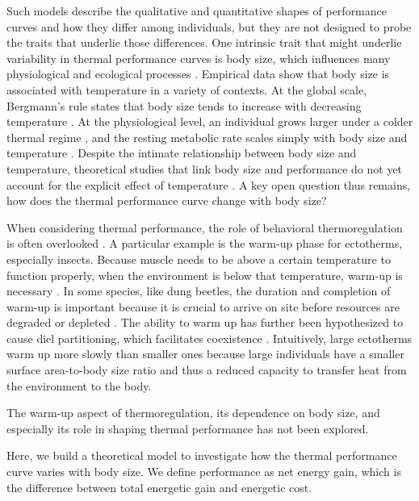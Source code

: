 Such models describe the qualitative and quantitative shapes of performance curves and how they differ among individuals, but they are not designed to probe the traits that underlie those differences.
One intrinsic trait that might underlie variability in thermal performance curves is body size, which influences many physiological and ecological processes \citep{Calder1984,Schmidt1984,Peters1986}.
Empirical data show that body size is associated with temperature in a variety of contexts.
At the global scale, Bergmann's rule states that body size tends to increase with decreasing temperature \citep{Bergmann1847, Blackburn1999}.
At the physiological level, an individual grows larger under a colder thermal regime \citep{VanVoorhies1996}, and the resting metabolic rate scales simply with body size and temperature \citep{Kleiber1947, Peters1986, Gillooly2001, Brown2004}.
Despite the intimate relationship between body size and temperature, theoretical studies that link body size and performance do not yet account for the explicit effect of temperature \citep[e.g.,][]{Yodzis1992, Brown1993}.
A key open question thus remains, how does the thermal performance curve change with body size?

When considering thermal performance, the role of behavioral thermoregulation is often overlooked \citep{Kearney2009b}.
A particular example is the warm-up phase for ectotherms, especially insects.
Because muscle needs to be above a certain temperature to function properly, when the environment is below that temperature, warm-up is necessary \citep[e.g.,][]{Heinrich1975}.
In some species, like dung beetles, the duration and completion of warm-up is important because it is crucial to arrive on site before resources are degraded or depleted \citep{Hanski1991}. %
The ability to warm up has further been hypothesized to cause diel partitioning, which facilitates coexistence \citep{Viljanen2009}.
Intuitively, large ectotherms warm up more slowly than smaller ones because large individuals have a smaller surface area-to-body size ratio and thus a reduced capacity to transfer heat from the environment to the body.

The warm-up aspect of thermoregulation, its dependence on body size, and especially its role in shaping thermal performance has not been explored.

Here, we build a theoretical model to investigate how the thermal performance curve varies with body size.
We define performance as net energy gain, which is the difference between total energetic gain and energetic cost.

